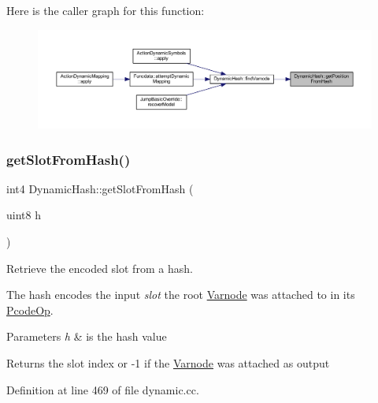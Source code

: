 Here is the caller graph for this function\+:
\nopagebreak
\begin{figure}[H]
\begin{center}
\leavevmode
\includegraphics[width=350pt]{class_dynamic_hash_a82c7a255745be65f7395d489a0bd4201_icgraph}
\end{center}
\end{figure}
\mbox{\label{class_dynamic_hash_ac5d5cb3b8c23327a82efe7f5f011fbbf}} 
\subsubsection{\texorpdfstring{getSlotFromHash()}{getSlotFromHash()}}
{\footnotesize\ttfamily int4 Dynamic\+Hash\+::get\+Slot\+From\+Hash (\begin{DoxyParamCaption}\item[{uint8}]{h }\end{DoxyParamCaption})\hspace{0.3cm}{\ttfamily [static]}}



Retrieve the encoded slot from a hash. 

The hash encodes the input {\itshape slot} the root \mbox{\hyperlink{class_varnode}{Varnode}} was attached to in its \mbox{\hyperlink{class_pcode_op}{Pcode\+Op}}. 
\begin{DoxyParams}{Parameters}
{\em h} & is the hash value \\
\hline
\end{DoxyParams}
\begin{DoxyReturn}{Returns}
the slot index or -\/1 if the \mbox{\hyperlink{class_varnode}{Varnode}} was attached as output 
\end{DoxyReturn}


Definition at line 469 of file dynamic.\+cc.

